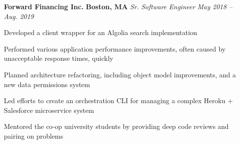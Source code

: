 \item
\headerrow
{\textbf{Forward Financing Inc.}}
{\textbf{Boston, MA}}
\headerrow
{\emph{Sr. Software Engineer}}
{\emph{May 2018 -- Aug. 2019}}
\begin{itemize*}
    \item Developed a client wrapper for an Algolia search implementation
    \item Performed various application performance improvements, often caused
    by unacceptable response times, quickly
    \item Planned architecture refactoring, including object model
    improvements, and a new data permissions system
    \item Led efforts to create an orchestration CLI for managing a complex
    Heroku + Salesforce microservice system
    \item Mentored the co-op university students by providing deep code
    reviews and pairing on problems
\end{itemize*}
